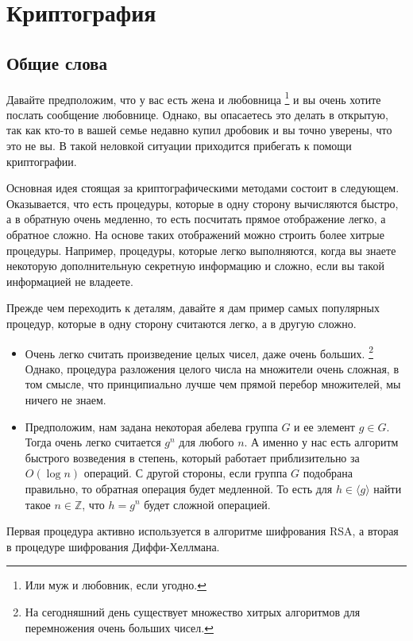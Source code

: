 \section{Криптография}

\subsection{Общие слова}

Давайте предположим, что у вас есть жена и любовница%
\footnote{Или муж и любовник, если угодно.}
и вы очень хотите послать сообщение любовнице. Однако, вы опасаетесь это делать в открытую, так как кто-то в вашей семье недавно купил дробовик и вы точно уверены, что это не вы. В такой неловкой ситуации приходится прибегать к помощи криптографии.

Основная идея стоящая за криптографическими методами состоит в следующем. Оказывается, что есть процедуры, которые в одну сторону вычисляются быстро, а в обратную очень медленно, то есть посчитать прямое отображение легко, а обратное сложно. На основе таких отображений можно строить более хитрые процедуры. Например, процедуры, которые легко выполняются, когда вы знаете некоторую дополнительную секретную информацию и сложно, если вы такой информацией не владеете.

Прежде чем переходить к деталям, давайте я дам пример самых популярных процедур, которые в одну сторону считаются легко, а в другую сложно.
\begin{itemize}
\item Очень легко считать произведение целых чисел, даже очень больших.%
\footnote{На сегодняшний день существует множество хитрых алгоритмов для перемножения очень больших чисел.}
Однако, процедура разложения целого числа на множители очень сложная, в том смысле, что принципиально лучше чем прямой перебор множителей, мы ничего не знаем.

\item  Предположим, нам задана некоторая абелева группа $G$ и ее элемент $g\in G$. Тогда очень легко считается $g^n$ для любого $n$. А именно у нас есть алгоритм быстрого возведения в степень, который работает приблизительно за $O(\log n)$ операций. С другой стороны, если группа $G$ подобрана правильно, то обратная операция будет медленной. То есть для $h\in \langle g \rangle$ найти такое $n\in \mathbb Z$, что $h = g^n$ будет сложной операцией.
\end{itemize}
Первая процедура активно используется в алгоритме шифрования RSA, а вторая в процедуре шифрования Диффи-Хеллмана.

